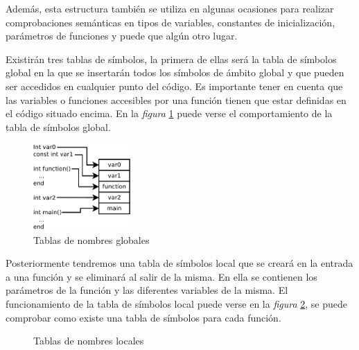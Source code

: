 \documentclass[a4paper,10pt]{article}
\begin{document}
Además, esta estructura también se utiliza en algunas ocasiones para realizar comprobaciones semánticas en tipos de variables, constantes de inicialización, parámetros de funciones y puede que algún otro lugar.

Existirán tres tablas de símbolos, la primera de ellas será la tabla de símbolos global en la que se insertarán todos los símbolos de ámbito global y que pueden ser accedidos en cualquier punto del código. Es importante tener en cuenta que las variables o funciones accesibles por una función tienen que estar definidas en el código situado encima. En la \emph{figura} \ref{fig:part2} puede verse el comportamiento de la tabla de símbolos global.

\begin{figure}[H]
  \centering
	\includegraphics[width=0.33\textwidth]{images/Diagram1.pdf}
  \caption{Tablas de nombres globales}
  \label{fig:part2}
\end{figure}

Posteriormente tendremos una tabla de símbolos local que se creará en la entrada a una función y se eliminará al salir de la misma. En ella se contienen los parámetros de la función y las diferentes variables de la misma. El funcionamiento de la tabla de símbolos local puede verse en la \emph{figura} \ref{fig:part1}, se puede comprobar como existe una tabla de símbolos para cada función.

\begin{figure}[H]
  \centering
  \hspace{11mm}
  \caption{Tablas de nombres locales}
  \label{fig:part1}
\end{figure}
\end{document}
